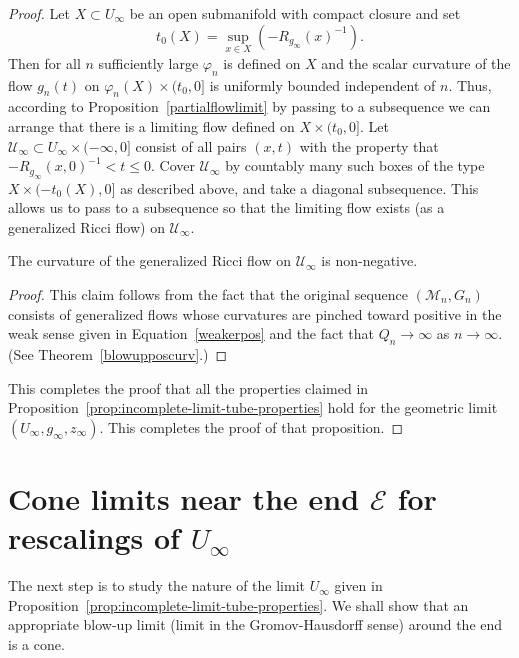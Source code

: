 \begin{proof}
Let $X\subset U_\infty$ be an open submanifold with compact closure
and set
$$t_0(X)= \sup_{x\in X}(-R_{g_\infty}(x)^{-1}).$$ Then for
all $n$ sufficiently large $\varphi_n$ is defined on $X$ and the
scalar curvature of the flow $g_n(t)$ on $\varphi_n(X)\times
(t_0,0]$ is uniformly bounded independent of $n$. Thus, according to
Proposition~\ref{partialflowlimit} by passing to a subsequence we
can arrange that there is a limiting flow defined on $X\times
(t_0,0]$. Let ${\mathcal U}_\infty\subset U_\infty\times
(-\infty,0]$ consist of all pairs $(x,t)$ with the property that
$-R_{g_\infty}(x,0)^{-1}<t\le 0$.
 Cover ${\mathcal U}_\infty$ by countably many such boxes
of the type $X\times (-t_0(X),0]$ as described above, and take a
diagonal subsequence. This allows us to pass to a subsequence so
that the limiting flow exists (as a generalized Ricci flow) on
${\mathcal U}_\infty$.



\begin{claim}
\label{claim:limiting-flow-nonnegative-curvature}
 The curvature of the generalized Ricci flow on ${\mathcal
U}_\infty$ is non-negative.
\end{claim}

\begin{proof}
 This claim follows from the fact that the
original sequence $({\mathcal M}_n,G_n)$ consists of generalized
flows whose curvatures are pinched toward positive in the weak sense
given in Equation~\ref{weakerpos} and the fact that $Q_n\rightarrow
\infty$ as $n\rightarrow \infty$. (See Theorem~\ref{blowupposcurv}.)
\end{proof}

This completes the proof that all the properties claimed in
Proposition~\ref{prop:incomplete-limit-tube-properties} hold for the geometric limit
$(U_\infty,g_\infty,z_\infty)$. This  completes the proof of that
proposition. \end{proof}





\section{Cone limits near the end ${\mathcal E}$ for rescalings of $U_\infty$}\label{GromHaus}

The next step is to study the nature  of the limit $U_\infty$ given
in Proposition~\ref{prop:incomplete-limit-tube-properties}. We shall show that an appropriate
blow-up limit (limit in the Gromov-Hausdorff sense) around the end
is a cone.

